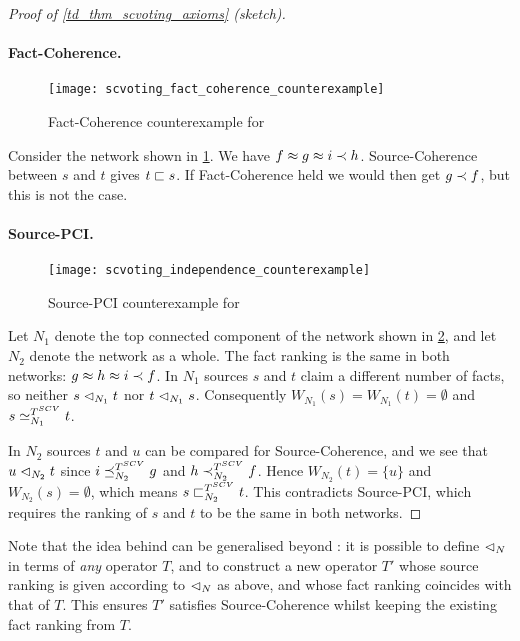 \begin{proof}[Proof of \cref{td_thm_scvoting_axioms} (sketch)]
\paragraph{Fact-Coherence.}

\begin{figure}
    \centering
    \texttt{[image: scvoting\_fact\_coherence\_counterexample]}
    \caption{
        Fact-Coherence counterexample for \scvoting{}
    }
    \label{td_fig_scvoting_fact_coherence_counterexample}
\end{figure}

Consider the network shown in
\cref{td_fig_scvoting_fact_coherence_counterexample}. We have $f \approx g \approx i
\prec h$. Source-Coherence between $s$ and $t$ gives $t \sqsubset s$. If
Fact-Coherence held we would then get $g \prec f$, but this is not the case.

\paragraph{Source-PCI.}

\begin{figure}
    \centering
    \texttt{[image: scvoting\_independence\_counterexample]}
    \caption{
        Source-PCI counterexample for \scvoting{}
    }
    \label{td_fig_scvoting_independence_counterexample}
\end{figure}

Let $N_1$ denote the top connected component of the network shown in
\cref{td_fig_scvoting_independence_counterexample}, and let $N_2$ denote the
network as a whole. The fact ranking is the same in both networks: $g \approx h
\approx i \prec f$.  In $N_1$ sources $s$ and $t$ claim a different number of
facts, so neither $s \mathrel{\lhd}_{N_1} t$ nor $t \mathrel{\lhd}_{N_1} s$. Consequently
$W_{N_1}(s) = W_{N_1}(t) = \emptyset$ and $s \simeq_{N_1}^{T^{SCV}} t$.

In $N_2$ sources $t$ and $u$ can be compared for Source-Coherence, and we see
that $u \mathrel{\lhd}_{N_2} t$ since $i \preceq_{N_2}^{T^{SCV}} g$ and $h
\prec_{N_2}^{T^{SCV}} f$. Hence $W_{N_2}(t) = \{u\}$ and $W_{N_2}(s) =
\emptyset$, which means $s \sqsubset_{N_2}^{T^{SCV}} t$. This contradicts
Source-PCI, which requires the ranking of $s$ and $t$ to be the same in both
networks.  \end{proof}

Note that the idea behind \scvoting{} can be generalised
beyond \voting{}: it is possible to define $\mathrel{\lhd}_N$ in terms of \emph{any}
operator $T$, and to construct a new operator $T'$ whose source ranking is
given according to $\mathrel{\lhd}_N$ as above, and whose fact ranking coincides with
that of $T$. This ensures $T'$ satisfies Source-Coherence whilst keeping the
existing fact ranking from $T$.


